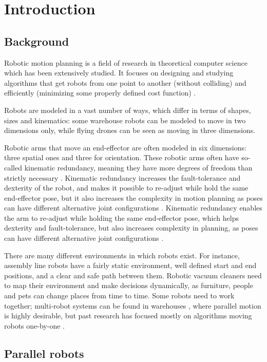 \section{Introduction}
\subsection{Background}

Robotic motion planning is a field of research in theoretical computer science which has been extensively studied.
It focuses on designing and studying algorithms that get robots from one point to another (without colliding) and efficiently (minimizing some properly defined cost function) \cite{mit/chosetPrinciplesRobotMotion2005}.

Robots are modeled in a vast number of ways, which differ in terms of shapes, sizes and kinematics: some warehouse robots can be modeled to move in two dimensions only, while flying drones can be seen as moving in three dimensions.

Robotic arms that move an end-effector are often modeled in six dimensions: three spatial ones and three for orientation.
These robotic arms often have so-called kinematic redundancy, meaning they have more degrees of freedom than strictly necessary \cite{robo/ChiaveriniOM16}.
Kinematic redundancy increases the fault-tolerance and dexterity of the robot, and makes it possible to re-adjust while hold the same end-effector pose, but it also increases the complexity in motion planning as poses can have different alternative joint configurations \cite{robo/ChiaveriniOM16}.
Kinematic redundancy enables the arm to re-adjust while holding the same end-effector pose, which helps dexterity and fault-tolerance, but also increases complexity in planning, as poses can have different alternative joint configurations \cite{robo/ChiaveriniOM16}.

There are many different environments in which robots exist.
For instance, assembly line robots have a fairly static environment, well defined start and end positions, and a clear and safe path between them.
Robotic vacuum cleaners need to map their environment and make decisions dynamically, as furniture, people and pets can change places from time to time.
Some robots need to work together; multi-robot systems can be found in warehouses \cite{robo/ParkerRS16}, where parallel motion is highly desirable, but past research has focused mostly on algorithms moving robots one-by-one \cite{siamcomp/DemaineFKMS19}.

\subsection{Parallel robots}


